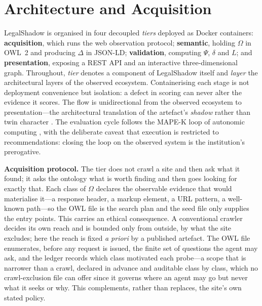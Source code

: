 \documentclass[engproc,proceedingpaper,submit,moreauthors]{Definitions/mdpi}
\begin{document}
\section{Architecture and Acquisition}
\label{sec:arch}

LegalShadow is organised in four decoupled \emph{tiers} deployed as Docker containers: \textbf{acquisition}, which runs the web observation protocol; \textbf{semantic}, holding $\Omega$ in OWL~2 and producing $\Delta$ in JSON-LD; \textbf{validation}, computing $\Psi$, $\delta$ and $L$; and \textbf{presentation}, exposing a REST API and an interactive three-dimensional graph. Throughout, \emph{tier} denotes a component of LegalShadow itself and \emph{layer} the architectural layers of the observed ecosystem. Containerising each stage is not deployment convenience but isolation: a defect in scoring can never alter the evidence it scores. The flow is unidirectional from the observed ecosystem to presentation---the architectural translation of the artefact's \emph{shadow} rather than twin character \cite{Kritzinger2018,Sepasgozar2021}. The evaluation cycle follows the MAPE-K loop of autonomic computing \cite{Kephart2003}, with the deliberate caveat that execution is restricted to recommendations: closing the loop on the observed system is the institution's prerogative.

    \textbf{Acquisition protocol.}
    The tier does not crawl a site and then ask what it found; it asks the ontology what is worth finding and then goes looking for exactly that. Each class of $\Omega$ declares the observable evidence that would materialise it---a response header, a markup element, a URL pattern, a well-known path---so the OWL file is the search plan and the seed file only supplies the entry points. This carries an ethical consequence. A conventional crawler decides its own reach and is bounded only from outside, by what the site excludes; here the reach is fixed \emph{a priori} by a published artefact. The OWL file enumerates, before any request is issued, the finite set of questions the agent may ask, and the ledger records which class motivated each probe---a scope that is narrower than a crawl, declared in advance and auditable class by class, which no crawl-exclusion file can offer since it governs where an agent may go but never what it seeks or why. This complements, rather than replaces, the site's own stated policy. %
\end{document}
